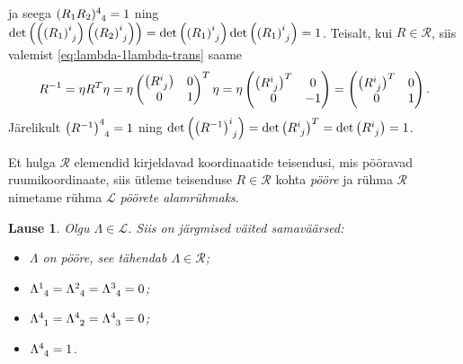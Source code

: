 \documentclass[12pt]{article}
\theoremstyle{plain}
\newtheorem{lause}{Lause}[section]
\theoremstyle{definition}
\numberwithin{equation}{section}
\def\L{{\mathcal L}}
\begin{document}
ja seega $(R_1 R_2)\indices{^4_4} = 1$ ning 
$\det \left(\left(\left(R_1\right)\indices{^i_j}\right) 
\left(\left(R_2\right)\indices{^i_j}\right) \right) = 
\det \left(\left(R_1\right)\indices{^i_j}\right) \det 
\left(\left(R_1\right)\indices{^i_j}\right) = 1$.
Teisalt, kui $R \in \mathcal{R}$, siis valemist 
\ref{eq:lambda-1lambda-trans} saame
\begin{align*}
R^{-1} = \eta R^T \eta = \eta \begin{pmatrix}
\left(R\indices{^i_j}\right) & 0 \\ 
0 & 1 \\ \end{pmatrix}^T \eta = 
\eta \begin{pmatrix}
\left(R\indices{^i_j}\right)^T & 0 \\ 
0 & -1 \\ \end{pmatrix} = \begin{pmatrix}
\left(R\indices{^i_j}\right)^T & 0 \\ 
0 & 1 \\ \end{pmatrix}.
\end{align*}
Järelikult $\left(R^{-1}\right)\indices{^4_4} = 1$ ning 
$\det \left(\left(R^{-1}\right)\indices{^i_j}\right) = 
\det \left(R\indices{^i_j}\right)^T = \det 
\left(R\indices{^i_j}\right) = 1$.

Et hulga $\mathcal{R}$ elemendid kirjeldavad koordinaatide 
teisendusi, mis pööravad ruumikoordinaate, siis ütleme teisenduse 
$R \in \mathcal{R}$ kohta \emph{pööre} ja rühma $\mathcal{R}$ 
nimetame rühma $\L$ \emph{pöörete alamrühmaks}.

\begin{lause} \label{lause:rotation}
Olgu $\Lambda \in \L$. Siis on järgmised väited samaväärsed:
\begin{itemize}
\item[$(i)$] $\Lambda$ on pööre, see tähendab $\Lambda \in 
\mathcal{R}$;
\item[$(ii)$] $\Lambda\indices{^1_4} = \Lambda\indices{^2_4} = 
\Lambda\indices{^3_4} = 0$;
\item[$(iii)$] $\Lambda\indices{^4_1} = \Lambda\indices{^4_2} = 
\Lambda\indices{^4_3} = 0$;
\item[$(iv)$] $\Lambda\indices{^4_4} = 1$.
\end{itemize}
\end{lause}
\end{document}
